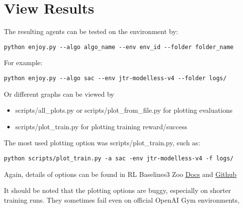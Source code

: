 \section{View Results}
The resulting agents can be tested on the environment by:
\begin{lstlisting}
python enjoy.py --algo algo_name --env env_id --folder folder_name
\end{lstlisting}
For example:
\begin{lstlisting}
python enjoy.py --algo sac --env jtr-modelless-v4 --folder logs/
\end{lstlisting}

\noindent
Or different graphs can be viewed by
\begin{itemize}
    \item scripts/all\_plots.py or scripts/plot\_from\_file.py for plotting evaluations
    \item scripts/plot\_train.py for plotting training reward/success
\end{itemize}

\noindent
The most used plotting option was scripts/plot\_train.py, such as:
\begin{lstlisting}
python scripts/plot_train.py -a sac -env jtr-modelless-v4 -f logs/
\end{lstlisting}

\noindent
Again, details of options can be found in RL Baselines3 Zoo \href{https://stable-baselines3.readthedocs.io/en/master/guide/rl_zoo.html}{\underline{Docs}} and \href{https://github.com/DLR-RM/rl-baselines3-zoo}{\underline{Github}}

It should be noted that the plotting options are buggy, especially on shorter training runs. They sometimes fail even on official OpenAI Gym environments, 

